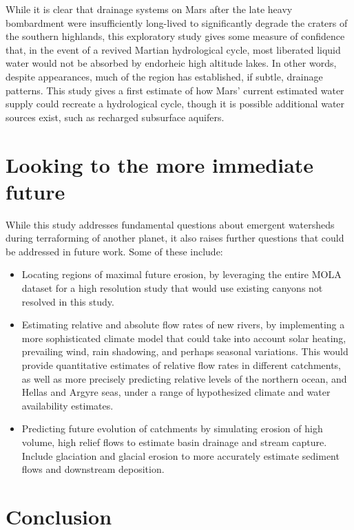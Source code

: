\documentclass[12pt]{iopart}
\numberwithin{equation}{section}
\begin{document}
While it is clear that drainage systems on Mars after the late heavy bombardment were insufficiently long-lived to significantly degrade the craters of the southern highlands, this exploratory study gives some measure of confidence that, in the event of a revived Martian hydrological cycle, most liberated liquid water would not be absorbed by endorheic high altitude lakes. In other words, despite appearances, much of the region has established, if subtle, drainage patterns. This study gives a first estimate of how Mars' current estimated water supply could recreate a hydrological cycle, though it is possible additional water sources exist, such as recharged subsurface aquifers\cite{rechargedaquifer}.

\section{Looking to the more immediate future}

While this study addresses fundamental questions about emergent watersheds during terraforming of another planet, it also raises further questions that could be addressed in future work. Some of these include:
\begin{itemize}
\item Locating regions of maximal future erosion, by leveraging the entire MOLA dataset for a high resolution study that would use existing canyons not resolved in this study.
\item Estimating relative and absolute flow rates of new rivers, by implementing a more sophisticated climate model that could take into account solar heating, prevailing wind, rain shadowing, and perhaps seasonal variations. This would provide quantitative estimates of relative flow rates in different catchments, as well as more precisely predicting relative levels of the northern ocean, and Hellas and Argyre seas, under a range of hypothesized climate and water availability estimates.
\item Predicting future evolution of catchments by simulating erosion of high volume, high relief flows to estimate basin drainage and stream capture. Include glaciation and glacial erosion to more accurately estimate sediment flows and downstream deposition.
\end{itemize}

\section{Conclusion}
\end{document}
